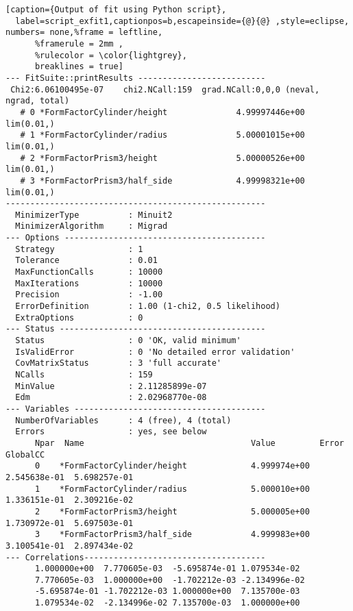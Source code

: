 \begin{lstlisting}[caption={Output of fit using Python script},
  label=script_exfit1,captionpos=b,escapeinside={@}{@} ,style=eclipse, numbers= none,%frame = leftline,
      %framerule = 2mm ,
      %rulecolor = \color{lightgrey},
      breaklines = true]
--- FitSuite::printResults --------------------------
 Chi2:6.06100495e-07    chi2.NCall:159  grad.NCall:0,0,0 (neval, ngrad, total)
   # 0 *FormFactorCylinder/height              4.99997446e+00  lim(0.01,)
   # 1 *FormFactorCylinder/radius              5.00001015e+00  lim(0.01,)
   # 2 *FormFactorPrism3/height                5.00000526e+00  lim(0.01,)
   # 3 *FormFactorPrism3/half_side             4.99998321e+00  lim(0.01,)
-----------------------------------------------------
  MinimizerType          : Minuit2
  MinimizerAlgorithm     : Migrad
--- Options -----------------------------------------
  Strategy               : 1
  Tolerance              : 0.01
  MaxFunctionCalls       : 10000
  MaxIterations          : 10000
  Precision              : -1.00
  ErrorDefinition        : 1.00 (1-chi2, 0.5 likelihood)
  ExtraOptions           : 0
--- Status ------------------------------------------ 
  Status                 : 0 'OK, valid minimum'
  IsValidError           : 0 'No detailed error validation'
  CovMatrixStatus        : 3 'full accurate'
  NCalls                 : 159
  MinValue               : 2.11285899e-07
  Edm                    : 2.02968770e-08
--- Variables ---------------------------------------
  NumberOfVariables      : 4 (free), 4 (total) 
  Errors                 : yes, see below
      Npar  Name                                  Value         Error         GlobalCC      
      0    *FormFactorCylinder/height             4.999974e+00  2.545638e-01  5.698257e-01  
      1    *FormFactorCylinder/radius             5.000010e+00  1.336151e-01  2.309216e-02  
      2    *FormFactorPrism3/height               5.000005e+00  1.730972e-01  5.697503e-01  
      3    *FormFactorPrism3/half_side            4.999983e+00  3.100541e-01  2.897434e-02  
--- Correlations-------------------------------------
      1.000000e+00  7.770605e-03  -5.695874e-01 1.079534e-02  
      7.770605e-03  1.000000e+00  -1.702212e-03 -2.134996e-02 
      -5.695874e-01 -1.702212e-03 1.000000e+00  7.135700e-03  
      1.079534e-02  -2.134996e-02 7.135700e-03  1.000000e+00  
\end{lstlisting}

